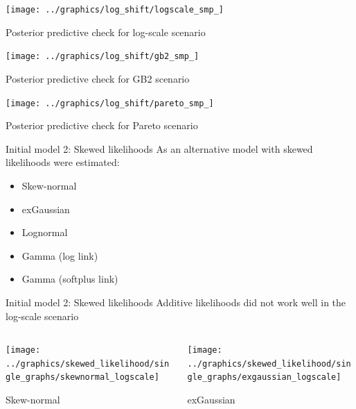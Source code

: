 \begin{frame}
    \vspace{-0.5cm}
    \centering
    \texttt{[image: ../graphics/log\_shift/logscale\_smp\_]}

    \scriptsize{Posterior predictive check for log-scale scenario}

    \texttt{[image: ../graphics/log\_shift/gb2\_smp\_]}

    \scriptsize{Posterior predictive check for GB2 scenario}

    \texttt{[image: ../graphics/log\_shift/pareto\_smp\_]}

    \scriptsize{Posterior predictive check for Pareto scenario}

\end{frame}

\begin{frame}{Initial model 2: Skewed likelihoods}
    As an alternative model with skewed likelihoods were estimated:
    \begin{itemize}
        \item Skew-normal
        \item exGaussian
        \item Lognormal
        \item Gamma (log link)
        \item Gamma (softplus link)
    \end{itemize}
\end{frame}

\begin{frame}{Initial model 2: Skewed likelihoods}
    Additive likelihoods did not work well in the log-scale scenario

    \begin{columns}
        \begin{column}{0.49\textwidth}
            \centering
            \texttt{[image: ../graphics/skewed\_likelihood/single\_graphs/skewnormal\_logscale]}

            Skew-normal
        \end{column}

        \begin{column}{0.49\textwidth}
            \centering
            \texttt{[image: ../graphics/skewed\_likelihood/single\_graphs/exgaussian\_logscale]}

            exGaussian
        \end{column}
    \end{columns}

\end{frame}

